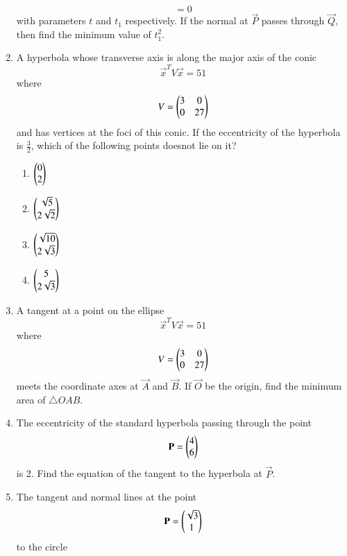 \documentclass[journal,12pt,twocolumn]{IEEEtran}
\begin{document}
\begin{enumerate}[label=\arabic*.]
\begin{equation}
 = 0
\end{equation}
with parameters $t$ and $t_1$ respectively.  If the normal at $\vec{P} $ passes through $\vec{Q}$, then find 
the minimum value of $t_1^2$.
\item A hyperbola whose transverse axis is along the major axis of the conic
\begin{equation}
\vec{x}^TV\vec{x} =51
\end{equation}
%
where
\begin{equation}
V = \begin{pmatrix}3 & 0 \\ 0 & 27\end{pmatrix}
\end{equation}
and has vertices at the foci of this conic.  If the eccentricity of the hyperbola is $\frac{3}{2}$, which of 
the following points doesnot lie on it?
\begin{enumerate}
\item $\begin{pmatrix} 0 \\ 2\end{pmatrix}$
\item $\begin{pmatrix}\sqrt{5}  \\ 2\sqrt{2}\end{pmatrix}$
\item $\begin{pmatrix}\sqrt{10}  \\ 2\sqrt{3}\end{pmatrix}$
\item $\begin{pmatrix}5 \\ 2\sqrt{3}\end{pmatrix}$
\end{enumerate}
\item A tangent at a point on the ellipse 
\begin{equation}
\vec{x}^TV\vec{x} =51
\end{equation}
%
where
\begin{equation}
V = \begin{pmatrix}3 & 0 \\ 0 & 27\end{pmatrix}
\end{equation}
%
meets the coordinate axes at  $\vec{A}$  and  $\vec{B}$.  If   $\vec{O}$  be the origin, find the minimum area 
of $\triangle OAB$.
\item The eccentricity of the standard hyperbola passing through the point 
\begin{equation}
\mathbf{P}= \begin{pmatrix}4 \\ 6\end{pmatrix}
\end{equation}
is 2.  Find the equation of the tangent to the hyperbola at $\vec{P}$.
\item The tangent and normal lines at the point 
\begin{equation}
\mathbf{P}= \begin{pmatrix}\sqrt{3} \\ 1\end{pmatrix}
\end{equation}
%
to the circle 
\begin{equation}

\end{equation}
\end{enumerate}
\end{document}
